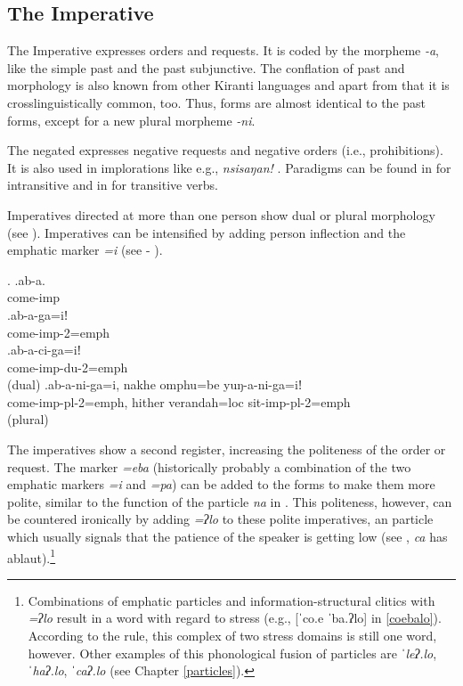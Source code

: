 \subsection{The Imperative}

The Imperative expresses orders and requests. It is coded by the morpheme \emph{-a}, like the simple past and the past subjunctive. The conflation of past and  morphology is also known from other Kiranti languages \citep{Bickel2003Belhare, Ebert2003Camling} and apart from that it is crosslinguistically common, too. Thus,  forms are almost identical to the past forms, except for a new plural morpheme \emph{-ni}. 

The negated  expresses negative requests and negative orders (i.e., prohibitions). It is also used in implorations like e.g., \emph{nsisaŋan!} . Paradigms can be found in  for intransitive and in  for transitive verbs.
 
Imperatives directed at more than one person show dual or plural morphology (see \Next).  Imperatives can be intensified by adding person inflection and the emphatic marker \emph{=i} (see \Next[b] - \Next[d]). 
 
 \ex. \ag.ab-a.\\
 come{\sc -imp}\\
 \bg.ab-a-ga=iǃ\\
come{\sc -imp-2=emph}\\
 \bg.ab-a-ci-ga=iǃ\\
come{\sc -imp-du-2=emph}\\
  (dual)
 \bg.ab-a-ni-ga=i, nakhe omphu=be yuŋ-a-ni-ga=iǃ\\
come{\sc -imp-pl-2=emph}, hither verandah{\sc =loc} sit{\sc -imp-pl-2=emph}\\
  (plural)
 
\largerpage
The imperatives show a second register, increasing the  politeness of the order or request. The marker \emph{=eba} (historically probably a combination of the two  emphatic markers  \emph{=i} and \emph{=pa}) can be added to the  forms to make them more polite, similar to the function of the  particle \emph{na} in   \Next. This politeness, however, can be countered ironically by adding \emph{=ʔlo} to these polite imperatives, an  particle which usually signals that  the patience of the speaker is getting low (see \Next[c], \emph{ca} has ablaut).\footnote{Combinations of emphatic particles and information-structural clitics with \emph{=ʔlo} result in a word with regard to stress (e.g., [ˈco.e ˈba.ʔlo] in \ref{coebalo}). According to the  rule,  this complex of two stress domains is still one word, however. Other examples of this phonological fusion of particles are \emph{ˈleʔ.lo}, \emph{ˈhaʔ.lo}, \emph{ˈcaʔ.lo} (see Chapter \ref{particles}).}

